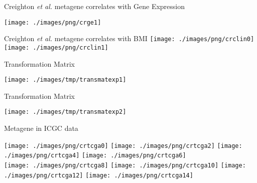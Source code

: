 \documentclass[handout]{beamer}
\begin{document}
\begin{frame}{\normalsize Creighton \textit{et al.} metagene correlates with Gene Expression}
	\begin{center}
		\texttt{[image: ./images/png/crge1]}
	\end{center}
\end{frame}

\begin{frame}{Creighton \textit{et al.} metagene correlates with BMI}
	\hspace{-4.0ex}
	\texttt{[image: ./images/png/crclin0]}
	\texttt{[image: ./images/png/crclin1]}
\end{frame}


\begin{frame}{Transformation Matrix}
	\begin{center}
		\texttt{[image: ./images/tmp/transmatexp1]}
	\end{center}
\end{frame}

\begin{frame}{Transformation Matrix}
	\begin{center}
		\texttt{[image: ./images/tmp/transmatexp2]}
	\end{center}
\end{frame}

\begin{frame}{Metagene in ICGC data}
	\begin{adjustwidth}{-1.5em}{-1.5em}
		\texttt{[image: ./images/png/crtcga0]}
		\texttt{[image: ./images/png/crtcga2]}
		\texttt{[image: ./images/png/crtcga4]}
		\texttt{[image: ./images/png/crtcga6]}\\
		\texttt{[image: ./images/png/crtcga8]}
		\texttt{[image: ./images/png/crtcga10]}
		\texttt{[image: ./images/png/crtcga12]}
		\texttt{[image: ./images/png/crtcga14]}
	\end{adjustwidth}
\end{frame}
\end{document}

